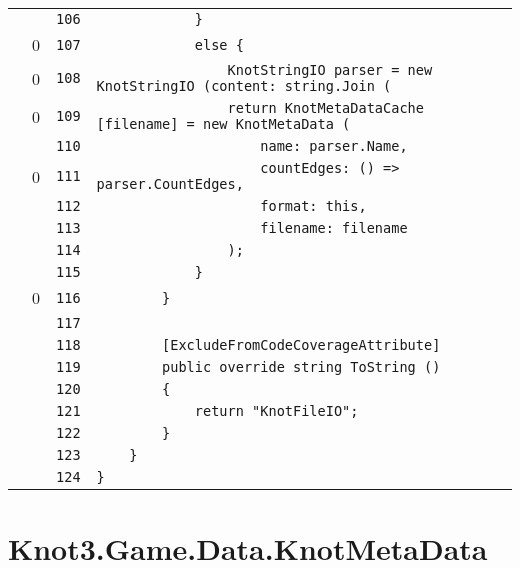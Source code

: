 \documentclass[a4paper,10pt]{article}
\begin{document}
\begin{longtable}[l]{lrrl}
\cellcolor{gray} &  & \verb~106~ & \verb~            }~\\
\cellcolor{red} & 0 & \verb~107~ & \verb~            else {~\\
\cellcolor{red} & 0 & \verb~108~ & \verb~                KnotStringIO parser = new KnotStringIO (content: string.Join (~\\
\cellcolor{red} & 0 & \verb~109~ & \verb~                return KnotMetaDataCache [filename] = new KnotMetaData (~\\
\cellcolor{gray} &  & \verb~110~ & \verb~                    name: parser.Name,~\\
\cellcolor{red} & 0 & \verb~111~ & \verb~                    countEdges: () => parser.CountEdges,~\\
\cellcolor{gray} &  & \verb~112~ & \verb~                    format: this,~\\
\cellcolor{gray} &  & \verb~113~ & \verb~                    filename: filename~\\
\cellcolor{gray} &  & \verb~114~ & \verb~                );~\\
\cellcolor{gray} &  & \verb~115~ & \verb~            }~\\
\cellcolor{red} & 0 & \verb~116~ & \verb~        }~\\
\cellcolor{gray} &  & \verb~117~ & \verb~~\\
\cellcolor{gray} &  & \verb~118~ & \verb~        [ExcludeFromCodeCoverageAttribute]~\\
\cellcolor{gray} &  & \verb~119~ & \verb~        public override string ToString ()~\\
\cellcolor{gray} &  & \verb~120~ & \verb~        {~\\
\cellcolor{gray} &  & \verb~121~ & \verb~            return "KnotFileIO";~\\
\cellcolor{gray} &  & \verb~122~ & \verb~        }~\\
\cellcolor{gray} &  & \verb~123~ & \verb~    }~\\
\cellcolor{gray} &  & \verb~124~ & \verb~}~\\
\end{longtable}
\newpage
\section{Knot3.Game.Data.KnotMetaData}
\end{document}
